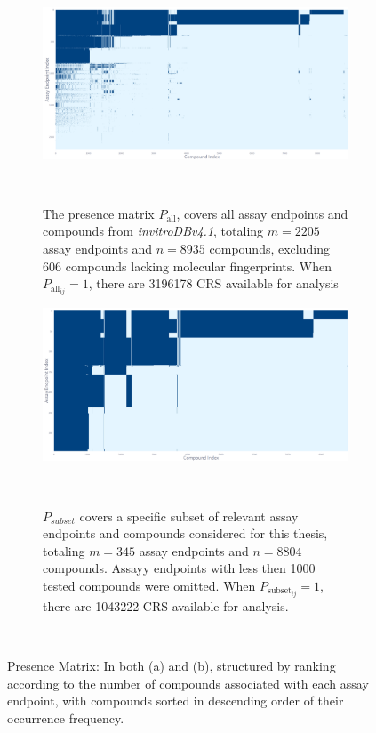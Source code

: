 \begin{figure}
    \centering
    \begin{subfigure}[b]{0.48\textwidth}
        \centering
        \includegraphics[width=\textwidth]{figures/presence_matrix_all.png}
        \caption{The presence matrix $P_{\text{all}}$, covers all assay endpoints and compounds from \emph{invitroDBv4.1}, totaling $m = \num{2205}$ assay endpoints and $n = \num{8935}$ compounds, excluding 606 compounds lacking molecular fingerprints. When $P_{\text{all}_{ij}} = 1$, there are \num{3196178} CRS available for analysis}
    ~\label{fig:presence_matrix_all}
    \end{subfigure}
    \hfill
    \begin{subfigure}[b]{0.48\textwidth}
        \centering
        \includegraphics[width=\textwidth]{figures/presence_matrix_subset.png}
        \caption{$P_{subset}$ covers a specific subset of relevant assay endpoints and compounds considered for this thesis, totaling $m = \num{345}$ assay endpoints and $n = \num{8804}$ compounds. Assayy endpoints with less then 1000 tested compounds were omitted. When $P_{\text{subset}_{ij}} = 1$, there are \num{1043222} CRS available for analysis.}
        ~\label{fig:presence_matrix_subset}
    \end{subfigure}
    \caption{Presence Matrix: In both (a) and (b), structured by ranking according to the number of compounds associated with each assay endpoint, with compounds sorted in descending order
    of their occurrence frequency.}
    ~\label{fig:presence_matrix}
\end{figure}


